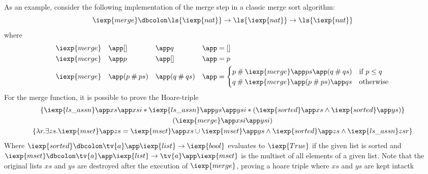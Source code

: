 As an example, consider the following implementation of the merge step in a classic merge sort algorithm:
$$
  \iexp{merge} \dbcolon \ls{\iexp{nat}} \rightarrow \ls{\iexp{nat}} \rightarrow \ls{\iexp{nat}}
$$
where
\begin{alignat*}{6}
  &\iexp{merge} &\app &[]                         &\app &q            &\app &= [] \\
  &\iexp{merge} &\app &p                          &\app &[]           &\app &= p \\
  &\iexp{merge} &\app &(p \mathbin{\#} ps) &\app &(q \mathbin{\#} qs) &\app &= \begin{cases} p \mathbin{\#} \iexp{merge} \app ps \app (q \mathbin{\#} qs) & \text{if } p \le q \\ q \mathbin{\#} \iexp{merge} \app (p \mathbin{\#} ps) \app qs & \text{otherwise} \end{cases}
\end{alignat*}
For the merge function, it is possible to prove the Hoare-triple
\begin{gather*}
 \{\iexp{ls\_assn} \app xs \app xsi \ast \iexp{ls\_assn} \app ys \app ysi \ast (\iexp{sorted} \app xs \land \iexp{sorted} \app ys)\} \\
(\iexp{merge} \app xsi \app ysi) \\
\{\lambda r. \exists zs. \iexp{mset} \app zs = \iexp{mset} \app xs \cup \iexp{mset} \app ys \land \iexp{sorted} \app zs \land \iexp{ls\_assn} zs r\}
\end{gather*}
Where $\iexp{sorted} \dbcolon \tv{a} \app \iexp{list} \rightarrow \iexp{bool}$ evaluates to $\iexp{True}$ if the given list is sorted and $\iexp{mset} \dbcolon \tv{a} \app \iexp{list} \rightarrow \tv{a} \app \iexp{mset}$ is the multiset of all elements of a given list.
Note that the original lists $xs$ and $ys$ are destroyed after the execution of $\iexp{merge}$, proving a hoare triple where $xs$ and $ys$ are kept intactk

